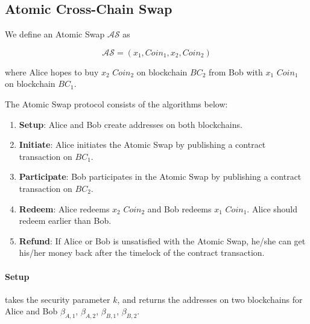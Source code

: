 

\subsection{Atomic Cross-Chain Swap}

\begin{definition}
We define an Atomic Swap $\mathcal{AS}$ as

$$\mathcal{AS} = (x_1, Coin_1, x_2, Coin_2)$$

where Alice hopes to buy $x_2$ $Coin_2$ on blockchain $BC_2$ from Bob with $x_1$ $Coin_1$ on blockchain $BC_1$.
\end{definition}

The Atomic Swap protocol consists of the algorithms below:

\begin{enumerate}
    \item \textbf{Setup}: Alice and Bob create addresses on both blockchains.
    \item \textbf{Initiate}: Alice initiates the Atomic Swap by publishing a contract transaction on $BC_1$.
    \item \textbf{Participate}: Bob participates in the Atomic Swap by publishing a contract transaction on $BC_2$.
    \item \textbf{Redeem}: Alice redeems $x_2$ $Coin_2$ and Bob redeems $x_1$ $Coin_1$. Alice should redeem earlier than Bob.
    \item \textbf{Refund}: If Alice or Bob is unsatisfied with the Atomic Swap, he/she can get his/her money back after the timelock of the contract transaction.
\end{enumerate}

\paragraph{Setup}
takes the security parameter $k$,
and returns the addresses on two blockchains for Alice and Bob $\beta_{A, 1}$, $\beta_{A, 2}$, $\beta_{B, 1}$, $\beta_{B, 2}$.

